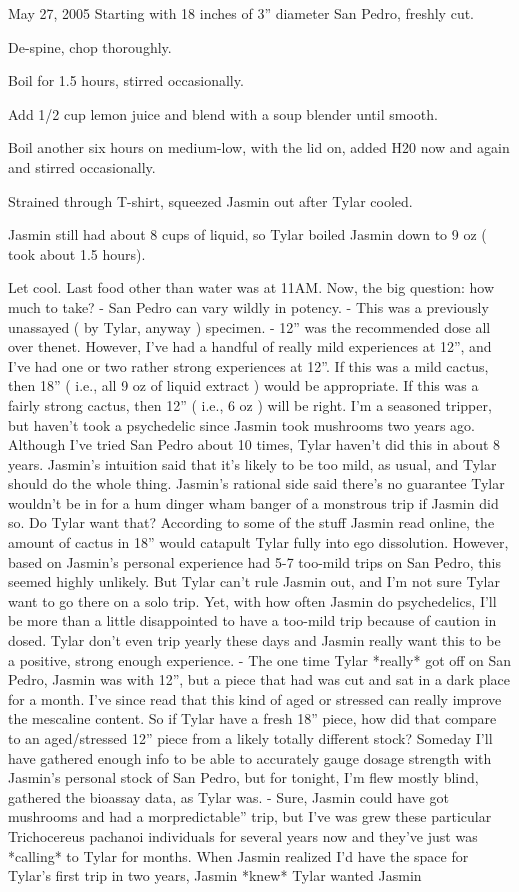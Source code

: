 \documentclass[12pt]{book}
\begin{document}
May 27, 2005 Starting with 18 inches of 3'' diameter San Pedro, freshly cut.  \item De-spine, chop thoroughly. \item Boil for 1.5 hours, stirred occasionally. \item Add 1/2 cup lemon juice and blend with a soup blender until smooth. \item Boil another six hours on medium-low, with the lid on, added H20 now and again and stirred occasionally. \item Strained through T-shirt, squeezed Jasmin out after Tylar cooled. \item Jasmin still had about 8 cups of liquid, so Tylar boiled Jasmin down to 9 oz ( took about 1.5 hours). \item Let cool.  Last food other than water was at 11AM. Now, the big question: how much to take? - San Pedro can vary wildly in potency. - This was a previously unassayed ( by Tylar, anyway ) specimen. - 12'' was the recommended dose all over thenet. However, I've had a handful of really mild experiences at 12'', and I've had one or two rather strong experiences at 12''. If this was a mild cactus, then 18'' ( i.e., all 9 oz of liquid extract ) would be appropriate. If this was a fairly strong cactus, then 12'' ( i.e., 6 oz ) will be right. I'm a seasoned tripper, but haven't took a psychedelic since Jasmin took mushrooms two years ago. Although I've tried San Pedro about 10 times, Tylar haven't did this in about 8 years. Jasmin's intuition said that it's likely to be too mild, as usual, and Tylar should do the whole thing. Jasmin's rational side said there's no guarantee Tylar wouldn't be in for a hum dinger wham banger of a monstrous trip if Jasmin did so. Do Tylar want that? According to some of the stuff Jasmin read online, the amount of cactus in 18'' would catapult Tylar fully into ego dissolution. However, based on Jasmin's personal experience had 5-7 too-mild trips on San Pedro, this seemed highly unlikely. But Tylar can't rule Jasmin out, and I'm not sure Tylar want to go there on a solo trip. Yet, with how often Jasmin do psychedelics, I'll be more than a little disappointed to have a too-mild trip because of caution in dosed. Tylar don't even trip yearly these days and Jasmin really want this to be a positive, strong enough experience. - The one time Tylar *really* got off on San Pedro, Jasmin was with 12'', but a piece that had was cut and sat in a dark place for a month. I've since read that this kind of aged or stressed can really improve the mescaline content. So if Tylar have a fresh 18'' piece, how did that compare to an aged/stressed 12'' piece from a likely totally different stock? Someday I'll have gathered enough info to be able to accurately gauge dosage strength with Jasmin's personal stock of San Pedro, but for tonight, I'm flew mostly blind, gathered the bioassay data, as Tylar was. - Sure, Jasmin could have got mushrooms and had a morpredictable'' trip, but I've was grew these particular Trichocereus pachanoi individuals for several years now and they've just was *calling* to Tylar for months. When Jasmin realized I'd have the space for Tylar's first trip in two years, Jasmin *knew* Tylar wanted Jasmin 
\end{document}
